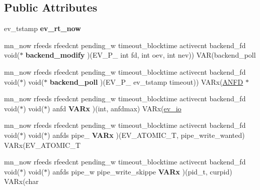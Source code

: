\subsection*{Public Attributes}
\begin{DoxyCompactItemize}
\item 
\hypertarget{structev__loop_a79e0d7a93635df5af6b3d5ee7d0dd613}{}\label{structev__loop_a79e0d7a93635df5af6b3d5ee7d0dd613} 
ev\+\_\+tstamp {\bfseries ev\+\_\+rt\+\_\+now}
\item 
\hypertarget{structev__loop_a638f5a179e4fdca869beb879625038bd}{}\label{structev__loop_a638f5a179e4fdca869beb879625038bd} 
mn\+\_\+now rfeeds rfeedcnt pending\+\_\+w timeout\+\_\+blocktime activecnt backend\+\_\+fd void($\ast$ {\bfseries backend\+\_\+modify} )(E\+V\+\_\+\+P\+\_\+ int fd, int oev, int nev)) V\+AR(backend\+\_\+poll
\item 
\hypertarget{structev__loop_a1214578019211e37965bee8bee4422a5}{}\label{structev__loop_a1214578019211e37965bee8bee4422a5} 
mn\+\_\+now rfeeds rfeedcnt pending\+\_\+w timeout\+\_\+blocktime activecnt backend\+\_\+fd void($\ast$) void($\ast$ {\bfseries backend\+\_\+poll} )(E\+V\+\_\+\+P\+\_\+ ev\+\_\+tstamp timeout)) V\+A\+Rx(\hyperlink{struct_a_n_f_d}{A\+N\+FD} $\ast$
\item 
\hypertarget{structev__loop_a4f38d64993c8d90bac02b5af805cb7f7}{}\label{structev__loop_a4f38d64993c8d90bac02b5af805cb7f7} 
mn\+\_\+now rfeeds rfeedcnt pending\+\_\+w timeout\+\_\+blocktime activecnt backend\+\_\+fd void($\ast$) void($\ast$) anfd {\bfseries V\+A\+Rx} )(int, anfdmax) V\+A\+Rx(\hyperlink{structev__io}{ev\+\_\+io}
\item 
\hypertarget{structev__loop_ace4c219a8e711d707721a502cc2783aa}{}\label{structev__loop_ace4c219a8e711d707721a502cc2783aa} 
mn\+\_\+now rfeeds rfeedcnt pending\+\_\+w timeout\+\_\+blocktime activecnt backend\+\_\+fd void($\ast$) void($\ast$) anfds pipe\+\_\+ {\bfseries V\+A\+Rx} )(E\+V\+\_\+\+A\+T\+O\+M\+I\+C\+\_\+T, pipe\+\_\+write\+\_\+wanted) V\+A\+Rx(E\+V\+\_\+\+A\+T\+O\+M\+I\+C\+\_\+T
\item 
\hypertarget{structev__loop_a3f00c5b63790f7ad669b81af249c2e0c}{}\label{structev__loop_a3f00c5b63790f7ad669b81af249c2e0c} 
mn\+\_\+now rfeeds rfeedcnt pending\+\_\+w timeout\+\_\+blocktime activecnt backend\+\_\+fd void($\ast$) void($\ast$) anfds pipe\+\_\+w pipe\+\_\+write\+\_\+skippe {\bfseries V\+A\+Rx} )(pid\+\_\+t, curpid) V\+A\+Rx(char
\item 
\hypertarget{structev__loop_a849bac09bf792abde809542ef5c8bb68}{}\label{structev__loop_a849bac09bf792abde809542ef5c8bb68} 

\end{DoxyCompactItemize}
